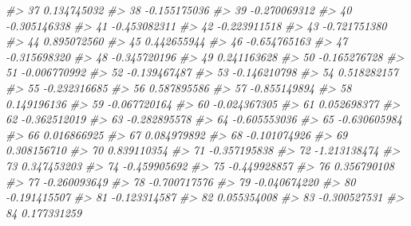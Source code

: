\documentclass[
  oneside]{book}
\newenvironment{Shaded}{\begin{snugshade}}{\end{snugshade}}
\newcommand{\CommentTok}[1]{\textcolor[rgb]{0.56,0.35,0.01}{\textit{#1}}}
\begin{document}
\begin{Shaded}
\begin{Highlighting}[]
\CommentTok{\#\textgreater{} 37         0.134745032}
\CommentTok{\#\textgreater{} 38        {-}0.155175036}
\CommentTok{\#\textgreater{} 39        {-}0.270069312}
\CommentTok{\#\textgreater{} 40        {-}0.305146338}
\CommentTok{\#\textgreater{} 41        {-}0.453082311}
\CommentTok{\#\textgreater{} 42        {-}0.223911518}
\CommentTok{\#\textgreater{} 43        {-}0.721751380}
\CommentTok{\#\textgreater{} 44         0.895072560}
\CommentTok{\#\textgreater{} 45         0.442655944}
\CommentTok{\#\textgreater{} 46        {-}0.654765163}
\CommentTok{\#\textgreater{} 47        {-}0.315698320}
\CommentTok{\#\textgreater{} 48        {-}0.345720196}
\CommentTok{\#\textgreater{} 49         0.241163628}
\CommentTok{\#\textgreater{} 50        {-}0.165276728}
\CommentTok{\#\textgreater{} 51        {-}0.006770992}
\CommentTok{\#\textgreater{} 52        {-}0.139467487}
\CommentTok{\#\textgreater{} 53        {-}0.146210798}
\CommentTok{\#\textgreater{} 54         0.518282157}
\CommentTok{\#\textgreater{} 55        {-}0.232316685}
\CommentTok{\#\textgreater{} 56         0.587895586}
\CommentTok{\#\textgreater{} 57        {-}0.855149894}
\CommentTok{\#\textgreater{} 58         0.149196136}
\CommentTok{\#\textgreater{} 59        {-}0.067720164}
\CommentTok{\#\textgreater{} 60        {-}0.024367305}
\CommentTok{\#\textgreater{} 61         0.052698377}
\CommentTok{\#\textgreater{} 62        {-}0.362512019}
\CommentTok{\#\textgreater{} 63        {-}0.282895578}
\CommentTok{\#\textgreater{} 64        {-}0.605553036}
\CommentTok{\#\textgreater{} 65        {-}0.630605984}
\CommentTok{\#\textgreater{} 66         0.016866925}
\CommentTok{\#\textgreater{} 67         0.084979892}
\CommentTok{\#\textgreater{} 68        {-}0.101074926}
\CommentTok{\#\textgreater{} 69         0.308156710}
\CommentTok{\#\textgreater{} 70         0.839110354}
\CommentTok{\#\textgreater{} 71        {-}0.357195838}
\CommentTok{\#\textgreater{} 72        {-}1.213138474}
\CommentTok{\#\textgreater{} 73         0.347453203}
\CommentTok{\#\textgreater{} 74        {-}0.459905692}
\CommentTok{\#\textgreater{} 75        {-}0.449928857}
\CommentTok{\#\textgreater{} 76         0.356790108}
\CommentTok{\#\textgreater{} 77        {-}0.260093649}
\CommentTok{\#\textgreater{} 78        {-}0.700717576}
\CommentTok{\#\textgreater{} 79        {-}0.040674220}
\CommentTok{\#\textgreater{} 80        {-}0.191415507}
\CommentTok{\#\textgreater{} 81        {-}0.123314587}
\CommentTok{\#\textgreater{} 82         0.055354008}
\CommentTok{\#\textgreater{} 83        {-}0.300527531}
\CommentTok{\#\textgreater{} 84         0.177331259}

\end{Highlighting}
\end{Shaded}
\end{document}
